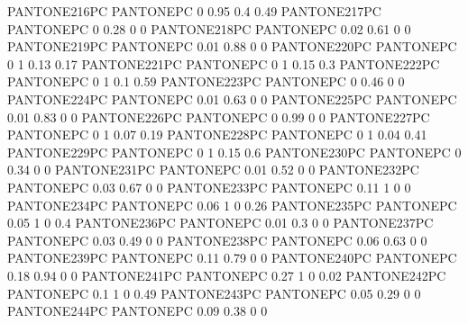  {PANTONE216PC} {PANTONE\SpotSpace PC} {0 0.95 0.4 0.49}
 {PANTONE217PC} {PANTONE\SpotSpace PC} {0 0.28 0 0}
 {PANTONE218PC} {PANTONE\SpotSpace PC} {0.02 0.61 0 0}
 {PANTONE219PC} {PANTONE\SpotSpace PC} {0.01 0.88 0 0}
 {PANTONE220PC} {PANTONE\SpotSpace PC} {0 1 0.13 0.17}
 {PANTONE221PC} {PANTONE\SpotSpace PC} {0 1 0.15 0.3}
 {PANTONE222PC} {PANTONE\SpotSpace PC} {0 1 0.1 0.59}
 {PANTONE223PC} {PANTONE\SpotSpace PC} {0 0.46 0 0}
 {PANTONE224PC} {PANTONE\SpotSpace PC} {0.01 0.63 0 0}
 {PANTONE225PC} {PANTONE\SpotSpace PC} {0.01 0.83 0 0}
 {PANTONE226PC} {PANTONE\SpotSpace PC} {0 0.99 0 0}
 {PANTONE227PC} {PANTONE\SpotSpace PC} {0 1 0.07 0.19}
 {PANTONE228PC} {PANTONE\SpotSpace PC} {0 1 0.04 0.41}
 {PANTONE229PC} {PANTONE\SpotSpace PC} {0 1 0.15 0.6}
 {PANTONE230PC} {PANTONE\SpotSpace PC} {0 0.34 0 0}
 {PANTONE231PC} {PANTONE\SpotSpace PC} {0.01 0.52 0 0}
 {PANTONE232PC} {PANTONE\SpotSpace PC} {0.03 0.67 0 0}
 {PANTONE233PC} {PANTONE\SpotSpace PC} {0.11 1 0 0}
 {PANTONE234PC} {PANTONE\SpotSpace PC} {0.06 1 0 0.26}
 {PANTONE235PC} {PANTONE\SpotSpace PC} {0.05 1 0 0.4}
 {PANTONE236PC} {PANTONE\SpotSpace PC} {0.01 0.3 0 0}
 {PANTONE237PC} {PANTONE\SpotSpace PC} {0.03 0.49 0 0}
 {PANTONE238PC} {PANTONE\SpotSpace PC} {0.06 0.63 0 0}
 {PANTONE239PC} {PANTONE\SpotSpace PC} {0.11 0.79 0 0}
 {PANTONE240PC} {PANTONE\SpotSpace PC} {0.18 0.94 0 0}
 {PANTONE241PC} {PANTONE\SpotSpace PC} {0.27 1 0 0.02}
 {PANTONE242PC} {PANTONE\SpotSpace PC} {0.1 1 0 0.49}
 {PANTONE243PC} {PANTONE\SpotSpace PC} {0.05 0.29 0 0}
 {PANTONE244PC} {PANTONE\SpotSpace PC} {0.09 0.38 0 0}
